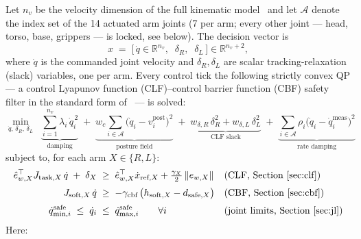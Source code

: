 \documentclass[12pt,a4paper,twoside,openright]{report}
\newcommand{\qdot}{\dot{q}}
\begin{document}
Let $n_v$ be the velocity dimension of the full kinematic model~\cite{carpentier2019} and let $\mathcal{A}$ denote the index set of the 14 actuated arm joints (7 per arm; every other joint --- head, torso, base, grippers --- is locked, see below). The decision vector is
\begin{equation}
x \;=\; \bigl[\,\qdot \in \mathbb{R}^{n_v},\;\; \delta_R,\;\; \delta_L\,\bigr] \in \mathbb{R}^{n_v+2},
\end{equation}
where $\qdot$ is the commanded joint velocity and $\delta_R,\delta_L$ are scalar tracking-relaxation (slack) variables, one per arm. Every control tick the following strictly convex QP --- a control Lyapunov function (CLF)--control barrier function (CBF) safety filter in the standard form of~\cite{ames2017cbf,ames2019ecc} --- is solved:
\begin{equation}
\label{eq:cost}
\min_{\qdot,\,\delta_R,\,\delta_L} \;\;
\underbrace{\sum_{i=1}^{n_v}\lambda_i\,\qdot_i^{\,2}}_{\text{damping}}
\;+\; \underbrace{w_c\!\!\sum_{i\in\mathcal{A}}\bigl(\qdot_i - v_i^{\text{post}}\bigr)^2}_{\text{posture field}}
\;+\; \underbrace{w_{\delta,R}\,\delta_R^2 + w_{\delta,L}\,\delta_L^2}_{\text{CLF slack}}
\;+\; \underbrace{\sum_{i\in\mathcal{A}} \rho_i\bigl(\qdot_i - \qdot_i^{\text{meas}}\bigr)^2}_{\text{rate damping}}
\end{equation}
subject to, for each arm $X \in \{R, L\}$:
\begin{align}
\hat{e}_{w,X}^{\top} J_{\text{task},X}\,\qdot \;+\; \delta_X \;&\ge\; \hat{e}_{w,X}^{\top}\dot{x}_{\text{ref},X} + \tfrac{\gamma_X}{2}\,\|e_{w,X}\| && \text{(CLF, Section~\ref{sec:clf})} \label{eq:clf}\\[2pt]
J_{\text{soft},X}\,\qdot \;&\ge\; -\gamma_{\text{cbf}}\,\bigl(h_{\text{soft},X} - d_{\text{safe},X}\bigr) && \text{(CBF, Section~\ref{sec:cbf})} \label{eq:cbf}\\[2pt]
\qdot_{\min,i}^{\text{safe}} \;\le\; \qdot_i \;&\le\; \qdot_{\max,i}^{\text{safe}} \qquad \forall i && \text{(joint limits, Section~\ref{sec:jl})} \label{eq:jl}
\end{align}
Here:
\end{document}
